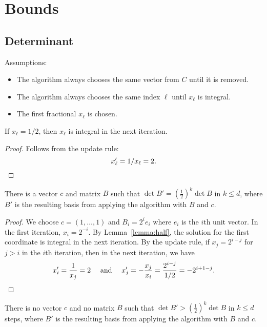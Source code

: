 \documentclass[english,version-2020-11]{uzl-thesis}
\begin{document}
\chapter{Bounds}

\section{Determinant}

Assumptions:
\begin{itemize}
  \item The algorithm always chooses the same vector from $C$ until it is removed.
  \item The algorithm always chooses the same index $\ell$ until $x_\ell$ is integral.
  \item The first fractional $x_\ell$ is chosen.
\end{itemize}

\begin{lemma}
  \label{lemma:half}
  If $x_\ell = 1/2$, then $x_\ell$ is integral in the next iteration.
\end{lemma}

\begin{proof}
  Follows from the update rule:
  \[
    x_\ell' = 1/x_\ell = 2. \qedhere
  \]
\end{proof}

\begin{lemma}
  There is a vector $c$ and matrix $B$
  such that $\det B' = \left(\frac12\right)^k \det B$ in $k \le d$,
  where $B'$ is the resulting basis from applying the algorithm with $B$ and $c$.
\end{lemma}

\begin{proof}
  We choose $c = (1, \dots, 1)$ and $B_i = 2^i e_i$ where $e_i$ is the $i$th unit vector.
  In the first iteration, $x_i = 2^{-i}$.
  By Lemma~\ref{lemma:half}, the solution for the first coordinate is integral
  in the next iteration.
  By the update rule, if $x_j = 2^{i - j}$ for $j > i$ in the $i$th iteration,
  then in the next iteration, we have
  \[
    x_i' = \frac{1}{x_j} = 2 \quad \text{ and } \quad x_{j}' = -\frac{x_j}{x_i} = \frac{2^{i-j}}{1/2} = -2^{i + 1 - j}. \qedhere
  \]
\end{proof}

\begin{lemma}
  There is no vector $c$ and no matrix $B$
  such that $\det B' > \left(\frac12\right)^k \det B$ in $k \le d$ steps,
  where $B'$ is the resulting basis from applying the algorithm with $B$ and $c$.
\end{lemma}
\end{document}
